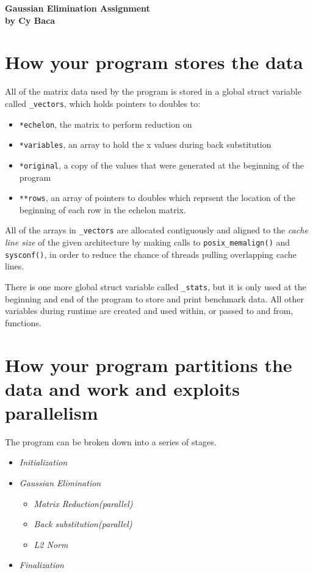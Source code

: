 \documentclass[a4paper,12pt]{article}
\author{Cy Baca}
\begin{document}
\begin{center}
    \Large{\textbf{Gaussian Elimination Assignment}} \\
    \small{\textbf{by Cy Baca}} \\
\end{center}

\section{How your program stores the data}
    All of the matrix data used by the program is stored in a global struct
    variable called \texttt{\_vectors}, which holds pointers to doubles to:

        \begin{itemize}
        \item \texttt{*echelon}, the matrix to perform reduction on
        \item \texttt{*variables}, an array to hold the x values during back
              substitution
        \item \texttt{*original}, a copy of the values that were generated at
              the beginning of the program
        \item \texttt{**rows}, an array of pointers to doubles which reprsent
              the location of the beginning of each row in the echelon matrix.
        \end{itemize}

    All of the arrays in \texttt{\_vectors} are allocated contiguously and
    aligned to the \emph{cache line size} of the given architecture by making
    calls to \texttt{posix\_memalign()} and \texttt{sysconf()}, in order to reduce
    the chance of threads pulling overlapping cache lines.

    There is one more global struct variable called \texttt{\_stats}, but it is
    only used at the beginning and end of the program to store and print
    benchmark data. All other variables during runtime are created and used
    within, or passed to and from, functions.

\section{How your program partitions the data and work and exploits parallelism}

    The program can be broken down into a series of stages.
    \begin{itemize}
    \item\emph{Initialization}
    \item\emph{Gaussian Elimination}
        \begin{itemize}
        \item\emph{Matrix Reduction(parallel)}
        \item\emph{Back substitution(parallel)}
        \item\emph{L2 Norm}
        \end{itemize}
    \item\emph{Finalization}
    \end{itemize}
\end{document}
